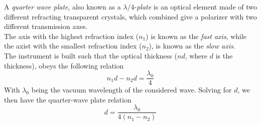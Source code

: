 \documentclass[../electromagnetism.tex]{subfiles}
\begin{document}
\begin{dfn}
	A \textit{quarter wave plate}, also known as a $\lambda/4$-\textit{plate} is an optical element made of two different refracting transparent crystals, which combined give a polarizer with two different transmission axes.\\
	The axis with the highest refraction index ($n_1$) is known as the \textit{fast axis}, while the axist with the smallest refraction index ($n_2$), is known as the \textit{slow axis}.\\
	The instrument is built such that the optical thickness ($nd$, where $d$ is the thickness), obeys the following relation
	\begin{equation*}
		n_1d-n_2d=\frac{\lambda_0}{4}
	\end{equation*}
	With $\lambda_0$ being the vacuum wavelength of the considered wave. Solving for $d$, we then have the quarter-wave plate relation
	\begin{equation}
		d=\frac{\lambda_0}{4(n_1-n_2)}
		\label{eq:thicknessquarterwave}
	\end{equation}

\end{dfn}
\end{document}
